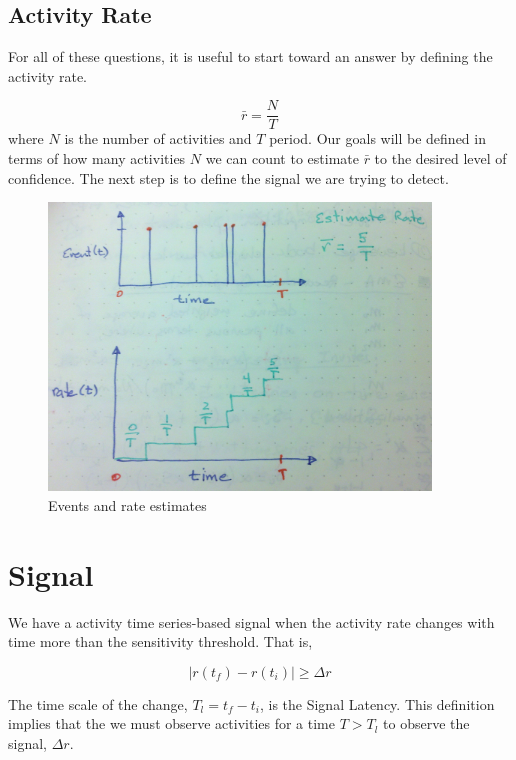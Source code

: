 \documentclass{article}
\begin{document}
\subsection{Activity Rate}

For all of these questions, it is useful to start toward an answer by defining the activity rate.

\begin{equation}
    \label{eq:rateEst}
    \bar{r} = \frac{N}{T}
\end{equation}
where $N$ is the number of activities and $T$ period.  Our goals will be defined in terms of how many activities $N$ we can count to estimate $\bar{r}$ to the desired level of confidence. The next step is to define the signal we are trying to detect.

\begin{figure}
    \centering
    \includegraphics[width=4.0in]{./imgs/events.jpg}
    \caption{Events and rate estimates}
    \label{fig:events}
\end{figure}

\section{Signal}

We have a activity time series-based signal when the activity rate changes with time more than the sensitivity threshold.  That is,

\begin{equation}
    \label{eq:signal}
    | r(t_f) - r(t_i) | \geq \Delta r
\end{equation}

The time scale of the change, $T_l = t_f - t_i$, is the Signal Latency.  This definition implies that the we must observe activities for a time $T > T_l$ to observe the signal, $\Delta r$.
\end{document}
